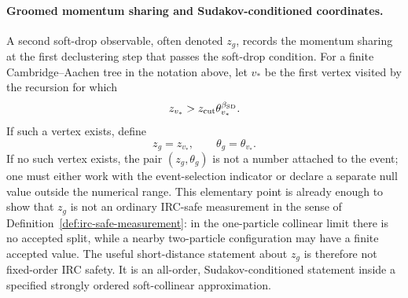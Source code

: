 \paragraph{Groomed momentum sharing and Sudakov-conditioned coordinates.}
A second soft-drop observable, often denoted \(z_g\), records the momentum
sharing at the first declustering step that passes the soft-drop condition.
For a finite Cambridge--Aachen tree in the notation above, let \(v_\ast\) be
the first vertex visited by the recursion for which
\[
  z_{v_\ast}>z_{\rm cut}\theta_{v_\ast}^{\beta_{\rm SD}} .
\]
If such a vertex exists, define
\[
  z_g=z_{v_\ast},
  \qquad
  \theta_g=\theta_{v_\ast}.
\]
If no such vertex exists, the pair \((z_g,\theta_g)\) is not a number attached
to the event; one must either work with the event-selection indicator or
declare a separate null value outside the numerical range.  This elementary
point is already enough to show that \(z_g\) is not an ordinary IRC-safe
measurement in the sense of Definition~\ref{def:irc-safe-measurement}: in the
one-particle collinear limit there is no accepted split, while a nearby
two-particle configuration may have a finite accepted value.  The useful
short-distance statement about \(z_g\) is therefore not fixed-order IRC
safety.  It is an all-order, Sudakov-conditioned statement inside a specified
strongly ordered soft-collinear approximation.

